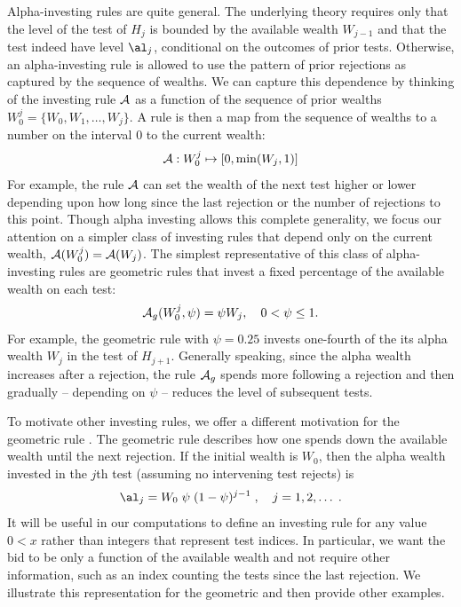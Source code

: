 \documentclass[12pt]{article}
\begin{document}
 
 Alpha-investing rules are quite general.  The underlying theory requires only
 that the level of the test of $H_j$ is bounded by the available wealth
 $W_{j-1}$ and that the test indeed have level $\al_j$, conditional on the
 outcomes of prior tests.  Otherwise, an alpha-investing rule is allowed to use
 the pattern of prior rejections as captured by the sequence of wealths.  We can
 capture this dependence by thinking of the investing rule ${\cal A}$ as a
 function of the sequence of prior wealths $W_0^j = \{W_0, W_1, \ldots, W_j\}$.
  A rule is then a map from the sequence of wealths to a number on the interval
 0 to the current wealth:
 \begin{equation}
    {\cal A}: W_0^j \mapsto [0, \min(W_j,1)]    
 \label{eq:A}
 \end{equation}
 For example, the rule $\cal A$ can set the wealth of the next test higher or
 lower depending upon how long since the last rejection or the number of
 rejections to this point.  Though alpha investing allows this complete
 generality, we focus our attention on a simpler class of investing rules that
 depend only on the current wealth, ${\cal A}(W_0^j) = {\cal A}(W_j)$.  The
 simplest representative of this class of alpha-investing rules are geometric
 rules that invest a fixed percentage of the available wealth on each test:
 \begin{equation}
    {\cal A}_g(W_0^j, \psi) = \psi W_j, \quad  0 < \psi \le 1.
 \label{eq:Ageo}
 \end{equation}
 For example, the geometric rule with $\psi = 0.25$ invests one-fourth of the
 its alpha wealth $W_j$ in the test of $H_{j+1}$.  Generally speaking, since the
 alpha wealth increases after a rejection, the rule ${\cal A}_g$ spends more
 following a rejection and then gradually -- depending on $\psi$ -- reduces the
 level of subsequent tests.
 

 To motivate other investing rules, we offer a different motivation for the
 geometric rule .  The geometric rule describes how one spends down
 the available wealth until the next rejection.  If the initial wealth is $W_0$,
 then the alpha wealth invested in the $j$th test (assuming no intervening test
 rejects) is
 \begin{equation}
    \al_j = W_0\; \psi \; (1-\psi)^{j-1} \;, \quad j = 1, 2, \ldots\;.   
 \label{eq:alj1}
 \end{equation}
 It will be useful in our computations to define an investing rule for any value
 $0 < x$ rather than integers that represent test indices.  In particular, we
 want the bid to be only a function of the available wealth and not require
 other information, such as an index counting the tests since the last
 rejection.  We illustrate this representation for the geometric and then
 provide other examples.  
\end{document}
